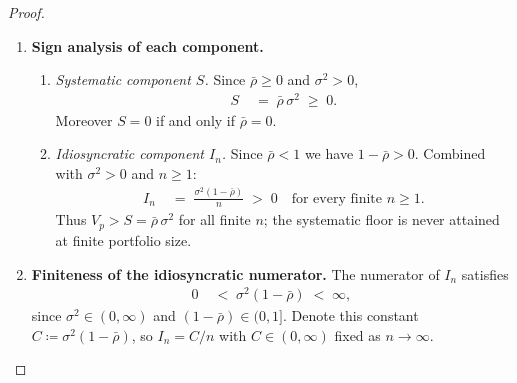 \documentclass[12pt,openany]{book}
\numberwithin{equation}{chapter}
\theoremstyle{plain}
\theoremstyle{definition}
\theoremstyle{remark}
\begin{document}
\begin{proof}
\begin{enumerate}
        We name the two summands for clarity:
        \begin{align}
          I_n
          &\;\coloneqq\;
            \frac{\sigma^2(1-\bar{\rho})}{n},
          &
          S
          &\;\coloneqq\;
            \bar{\rho}\,\sigma^2,
          \label{eq:cor-components}
        \end{align}
        so that $V_p = I_n + S$ for all $n \geq 1$.
        The term $I_n$ depends on $n$ and is called the
        \emph{idiosyncratic component}; the term $S$ is independent
        of $n$ and is called the \emph{systematic component}.

  \item \textbf{Sign analysis of each component.}
        \begin{enumerate}
          \item \emph{Systematic component $S$.}
                Since $\bar{\rho} \geq 0$ and $\sigma^2 > 0$,
                \begin{align}
                  S
                  &\;=\; \bar{\rho}\,\sigma^2
                  \;\geq\; 0.
                  \label{eq:cor-S-sign}
                \end{align}
                Moreover $S = 0$ if and only if $\bar{\rho} = 0$.
          \item \emph{Idiosyncratic component $I_n$.}
                Since $\bar{\rho} < 1$ we have $1 - \bar{\rho} > 0$.
                Combined with $\sigma^2 > 0$ and $n \geq 1$:
                \begin{align}
                  I_n
                  &\;=\;
                    \frac{\sigma^2(1-\bar{\rho})}{n}
                  \;>\; 0
                  \quad \text{for every finite } n \geq 1.
                  \label{eq:cor-In-sign}
                \end{align}
                Thus $V_p > S = \bar{\rho}\,\sigma^2$ for all finite
                $n$; the systematic floor is never attained at finite
                portfolio size.
        \end{enumerate}

  \item \textbf{Finiteness of the idiosyncratic numerator.}
        The numerator of $I_n$ satisfies
        \begin{align}
          0
          &\;<\;
            \sigma^2(1-\bar{\rho})
          \;<\; \infty,
          \label{eq:cor-numerator}
        \end{align}
        since $\sigma^2 \in (0,\infty)$ and
        $(1-\bar{\rho}) \in (0,1]$.
        Denote this constant $C \coloneqq \sigma^2(1-\bar{\rho})$,
        so $I_n = C/n$ with $C \in (0,\infty)$ fixed as
        $n \to \infty$.


\end{enumerate}
\end{proof}
\end{document}
